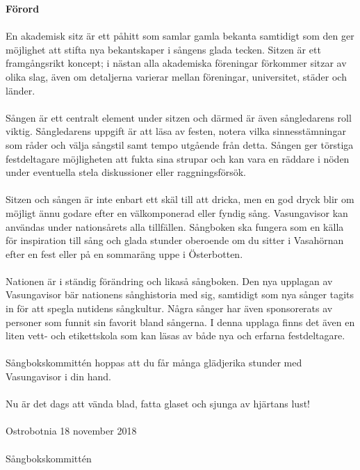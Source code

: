 \begin{scriptsize}

\flushleft\textbf{Förord}\\
~\\
En akademisk sitz är ett påhitt som samlar gamla bekanta samtidigt som den ger möjlighet att stifta nya bekantskaper i sångens glada tecken. Sitzen är ett framgångsrikt koncept; i nästan alla akademiska föreningar förkommer sitzar av olika slag, även om detaljerna varierar mellan föreningar, universitet, städer och länder.
\\
~\\
Sången är ett centralt element under sitzen och därmed är även sångledarens roll viktig. Sångledarens uppgift är att läsa av festen, notera vilka sinnesstämningar som råder och välja sångstil samt tempo utgående från detta. Sången ger törstiga festdeltagare möjligheten att fukta sina strupar och kan vara en räddare i nöden under eventuella stela diskussioner eller raggningsförsök.
\\
~\\
Sitzen och sången är inte enbart ett skäl till att dricka, men en god dryck blir om möjligt ännu godare efter en välkomponerad eller fyndig sång. Vasungavisor kan användas under nationsårets alla tillfällen. Sångboken ska fungera som en källa för inspiration till sång och glada stunder oberoende om du sitter i Vasahörnan efter en fest eller på en sommaräng uppe i Österbotten.
\\
~\\
Nationen är i ständig förändring och likaså sångboken. Den nya upplagan av Vasungavisor bär nationens sånghistoria med sig, samtidigt som nya sånger tagits in för att spegla nutidens sångkultur. Några sånger har även sponsorerats av personer som funnit sin favorit bland sångerna. I denna upplaga finns det även en liten vett- och etikettskola som kan läsas av både nya och erfarna festdeltagare. 
\\
~\\
Sångbokskommittén hoppas att du får många glädjerika stunder med Vasungavisor i din hand.
\\
~\\
Nu är det dags att vända blad, fatta glaset och sjunga av hjärtans lust!
\\
~\\
Ostrobotnia 18 november 2018
\\
~\\
Sångbokskommittén
\end{scriptsize}
